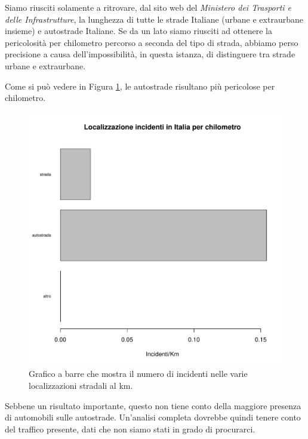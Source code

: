 \documentclass[12pt,a4paper,final,oneside]{article}			%
\begin{document}
        Siamo riusciti solamente a ritrovare, dal sito web del \textit{Ministero dei Trasporti e delle Infrastrutture}, la lunghezza di tutte le strade Italiane (urbane e extraurbane insieme) e autostrade Italiane. Se da un lato siamo riusciti ad ottenere la pericolosità per chilometro percorso a seconda del tipo di strada, abbiamo perso precisione a causa dell’impossibilità, in questa istanza, di distinguere tra strade urbane e extraurbane.
        
        Come si può vedere in Figura \ref{Fig: localizzazione_incidenti_per_chilometro}, le autostrade risultano più pericolose per chilometro. 
        
        \begin{figure}[h]
            \centering
            \includegraphics[scale=0.45]{../results/localizzazione_per_chilometro.pdf}
            \caption{Grafico a barre che mostra il numero di incidenti nelle varie localizzazioni stradali al km.}
            \label{Fig: localizzazione_incidenti_per_chilometro}
        \end{figure}
        
        Sebbene un risultato importante, questo non tiene conto della maggiore presenza di automobili sulle autostrade. Un'analisi completa dovrebbe quindi tenere conto del traffico presente, dati che non siamo stati in grado di procurarci.
        
\end{document}
